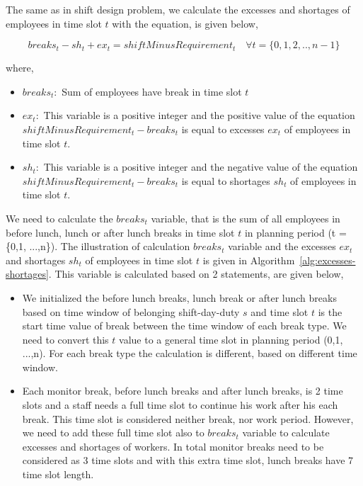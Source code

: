 The same as in shift design problem, we calculate the excesses and shortages of employees in time slot $t$ with the equation, is given below,

\begin{equation}
breaks_t - sh_t + ex_t = shiftMinusRequirement_t \quad \forall t = \{0, 1, 2, .., n-1\}
\end{equation}

where,
\begin{itemize}
\item[]  $breaks_t : $ Sum of employees have break in time slot $t$ 
\item[]  $ex_t : $ This variable is a positive integer and the positive value of the equation $shiftMinusRequirement_t - breaks_t$
is equal to excesses  $ex_t$  of employees in time slot $t$.
\item[]  $sh_t : $ This variable is a positive integer and the negative value of  the equation $shiftMinusRequirement_t - breaks_t$
is equal to shortages  $sh_t$ of employees in time slot $t$.
\end{itemize}

We need to calculate the $breaks_t$ variable, that is the sum of all employees in before lunch, lunch or after lunch breaks in time slot $t$ in planning period (t =\{0,1, ...,n\}). The illustration of calculation $breaks_t$ variable and the excesses $ex_t$ and shortages $sh_t$ of employees in time slot $t$ is given in Algorithm~\ref{alg:excesses-shortages}. This variable is calculated based on 2 statements, are given below,
\begin{itemize}

\item We initialized the before lunch breaks, lunch break or after lunch breaks based on time window of belonging shift-day-duty $s$ and time slot $t$ is the start time value of break between the time window of each break type. We need to convert this $t$ value to a general time slot in planning period (0,1, ...,n). For each break type the calculation is different, based on different time window. 


\item Each monitor break, before lunch breaks and after lunch breaks, is 2 time slots and a staff needs a full time slot to continue his work after his each break. This time slot is considered neither break, nor work period. However, we need to add these full time slot also to $breaks_t$ variable to calculate excesses and shortages of workers. In total monitor breaks need to be considered as 3 time slots and with this extra time slot, lunch breaks have 7 time slot length.

\end{itemize}

